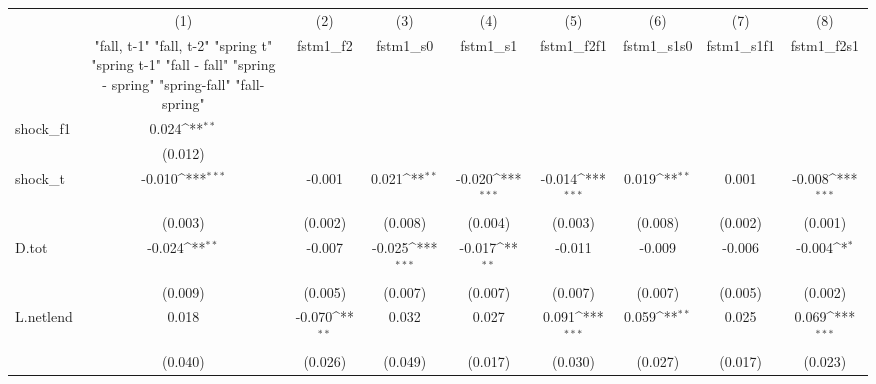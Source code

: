 {
\def\sym#1{\ifmmode^{#1}\else\(^{#1}\)\fi}
\begin{tabular}{l*{8}{c}}
\toprule
            &\multicolumn{1}{c}{(1)}&\multicolumn{1}{c}{(2)}&\multicolumn{1}{c}{(3)}&\multicolumn{1}{c}{(4)}&\multicolumn{1}{c}{(5)}&\multicolumn{1}{c}{(6)}&\multicolumn{1}{c}{(7)}&\multicolumn{1}{c}{(8)}\\
            &\multicolumn{1}{c}{  "fall, t-1" "fall, t-2" "spring t" "spring t-1"  "fall - fall" "spring - spring" "spring-fall" "fall-spring" }&\multicolumn{1}{c}{fstm1\_f2}&\multicolumn{1}{c}{fstm1\_s0}&\multicolumn{1}{c}{fstm1\_s1}&\multicolumn{1}{c}{fstm1\_f2f1}&\multicolumn{1}{c}{fstm1\_s1s0}&\multicolumn{1}{c}{fstm1\_s1f1}&\multicolumn{1}{c}{fstm1\_f2s1}\\
\midrule
shock\_f1    &       0.024\sym{**} &                     &                     &                     &                     &                     &                     &                     \\
            &     (0.012)         &                     &                     &                     &                     &                     &                     &                     \\
\addlinespace
shock\_t     &      -0.010\sym{***}&      -0.001         &       0.021\sym{**} &      -0.020\sym{***}&      -0.014\sym{***}&       0.019\sym{**} &       0.001         &      -0.008\sym{***}\\
            &     (0.003)         &     (0.002)         &     (0.008)         &     (0.004)         &     (0.003)         &     (0.008)         &     (0.002)         &     (0.001)         \\
\addlinespace
D.tot       &      -0.024\sym{**} &      -0.007         &      -0.025\sym{***}&      -0.017\sym{**} &      -0.011         &      -0.009         &      -0.006         &      -0.004\sym{*}  \\
            &     (0.009)         &     (0.005)         &     (0.007)         &     (0.007)         &     (0.007)         &     (0.007)         &     (0.005)         &     (0.002)         \\
\addlinespace
L.netlend   &       0.018         &      -0.070\sym{**} &       0.032         &       0.027         &       0.091\sym{***}&       0.059\sym{**} &       0.025         &       0.069\sym{***}\\
            &     (0.040)         &     (0.026)         &     (0.049)         &     (0.017)         &     (0.030)         &     (0.027)         &     (0.017)         &     (0.023)         \\

\end{tabular}}
